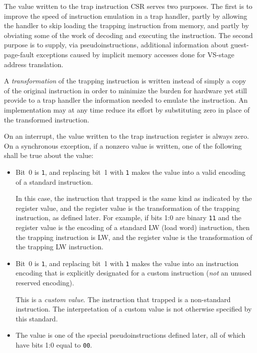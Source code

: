 \begin{commentary}
The value written to the trap instruction CSR serves two purposes.
The first is to improve the speed of instruction emulation in a trap
handler, partly by allowing the handler to skip loading the trapping
instruction from memory, and partly by obviating some of the work of
decoding and executing the instruction.
The second purpose is to supply, via pseudoinstructions, additional
information about guest-page-fault exceptions caused by implicit memory
accesses done for VS-stage address translation.

A \emph{transformation} of the trapping instruction is written instead of
simply a copy of the original instruction in order to minimize the burden
for hardware yet still provide to a trap handler the information needed
to emulate the instruction.
An implementation may at any time reduce its effort by substituting zero
in place of the transformed instruction.
\end{commentary}

On an interrupt, the value written to the trap instruction register is
always zero.
On a synchronous exception, if a nonzero value is written, one of the
following shall be true about the value:

\begin{itemize}

\item
Bit~0 is {\tt 1}, and replacing bit~1 with {\tt 1} makes the value into a
valid encoding of a standard instruction.

In this case, the instruction that trapped is the same kind as indicated
by the register value, and the register value is the transformation of
the trapping instruction, as defined later.
For example, if bits 1:0 are binary {\tt 11} and the register value is
the encoding of a standard LW (load word) instruction, then the trapping
instruction is LW, and the register value is the transformation of the
trapping LW instruction.

\item
Bit~0 is {\tt 1}, and replacing bit~1 with {\tt 1} makes the value into
an instruction encoding that is explicitly designated for a custom
instruction (\emph{not} an unused reserved encoding).

This is a \textit{custom value}.
The instruction that trapped is a non-standard instruction.
The interpretation of a custom value is not otherwise specified by this
standard.

\item
The value is one of the special pseudoinstructions defined later, all of
which have bits 1:0 equal to {\tt 00}.

\end{itemize}

